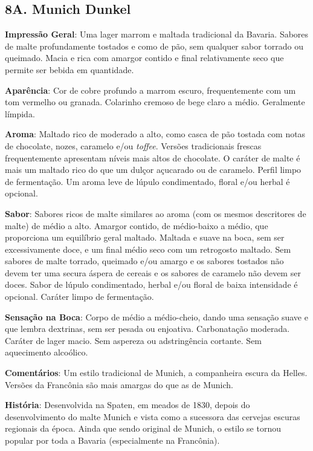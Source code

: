 \subsection*{8A. Munich Dunkel}

\textbf{Impressão Geral}: Uma lager marrom e maltada tradicional da Bavaria. Sabores de malte profundamente tostados e como de pão, sem qualquer sabor torrado ou queimado. Macia e rica com amargor contido e final relativamente seco que permite ser bebida em quantidade.

\textbf{Aparência}: Cor de cobre profundo a marrom escuro, frequentemente com um tom vermelho ou granada. Colarinho cremoso de bege claro a médio. Geralmente límpida.

\textbf{Aroma}: Maltado rico de moderado a alto, como casca de pão tostada com notas de chocolate, nozes, caramelo e/ou \textit{toffee}. Versões tradicionais frescas frequentemente apresentam níveis mais altos de chocolate. O caráter de malte é mais um maltado rico do que um dulçor açucarado ou de caramelo. Perfil limpo de fermentação. Um aroma leve de lúpulo condimentado, floral e/ou herbal é opcional.

\textbf{Sabor}: Sabores ricos de malte similares ao aroma (com os mesmos descritores de malte) de médio a alto. Amargor contido, de médio-baixo a médio, que proporciona um equilíbrio geral maltado. Maltada e suave na boca, sem ser excessivamente doce, e um final médio seco com um retrogosto maltado. Sem sabores de malte torrado, queimado e/ou amargo e os sabores tostados não devem ter uma secura áspera de cereais e os sabores de caramelo não devem ser doces. Sabor de lúpulo condimentado, herbal e/ou floral de baixa intensidade é opcional. Caráter limpo de fermentação.

\textbf{Sensação na Boca}: Corpo de médio a médio-cheio, dando uma sensação suave e que lembra dextrinas, sem ser pesada ou enjoativa. Carbonatação moderada. Caráter de lager macio. Sem aspereza ou adstringência cortante. Sem aquecimento alcoólico.

\textbf{Comentários}: Um estilo tradicional de Munich, a companheira escura da Helles. Versões da Francônia são mais amargas do que as de Munich.

\textbf{História}: Desenvolvida na Spaten, em meados de 1830, depois do desenvolvimento do malte Munich e vista como a sucessora das cervejas escuras regionais da época. Ainda que sendo original de Munich, o estilo se tornou popular por toda a Bavaria (especialmente na Francônia).

